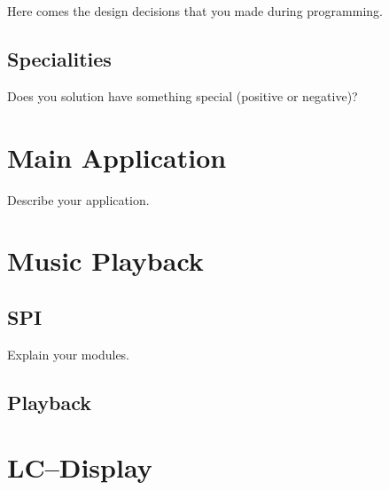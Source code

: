 \documentclass[12pt,a4paper,titlepage,oneside]{article}
\begin{document}
Here comes the design decisions that you made during programming.

\subsection{Specialities}

Does you solution have something special (positive or negative)?


\section{Main Application}

Describe your application.





\section{Music Playback}

\subsection{SPI}

Explain your modules.

\subsection{Playback}


\section{LC--Display}
\end{document}
